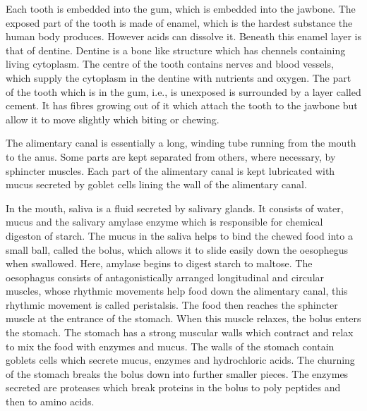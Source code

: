 Each tooth is embedded into the gum, which is embedded into the jawbone. The exposed part of the
tooth is made of enamel, which is the hardest substance the human body produces. However acids
can dissolve it. Beneath this enamel layer is that of dentine. Dentine is a bone like structure
which has chennels containing living cytoplasm. The centre of the tooth contains nerves and blood
vessels, which supply the cytoplasm in the dentine with nutrients and oxygen. The part of the tooth
which is in the gum, i.e., is unexposed is surrounded by a layer called cement. It has fibres
growing out of it which attach the tooth to the jawbone but allow it to move slightly which biting
or chewing.

The alimentary canal is essentially a long, winding tube running from the mouth to the anus. Some
parts are kept separated from others, where necessary, by sphincter muscles. Each part of the
alimentary canal is kept lubricated with mucus secreted by goblet cells lining the wall of the
alimentary canal.

In the mouth, saliva is a fluid secreted by salivary glands. It consists of water, mucus and the
salivary amylase enzyme which is responsible for chemical digeston of starch. The mucus in the
saliva helps to bind the chewed food into a small ball, called the bolus, which allows it to slide 
easily down the oesophegus when swallowed. Here, amylase begins to digest starch to maltose. The
oesophagus consists of antagonistically arranged longitudinal and circular muscles, whose rhythmic 
movements help food down
the alimentary canal, this rhythmic movement is called peristalsis. The food then reaches the
sphincter muscle at the entrance of the stomach. When this muscle relaxes, the bolus enters
the stomach. The stomach has a strong muscular walls which contract and relax to mix the food
with enzymes and mucus. The walls of the stomach contain goblets cells which secrete mucus, enzymes
and hydrochloric acids. The churning of the stomach breaks the bolus down into further smaller
pieces. The enzymes secreted are proteases which break proteins in the bolus to poly peptides and
then to amino acids.

